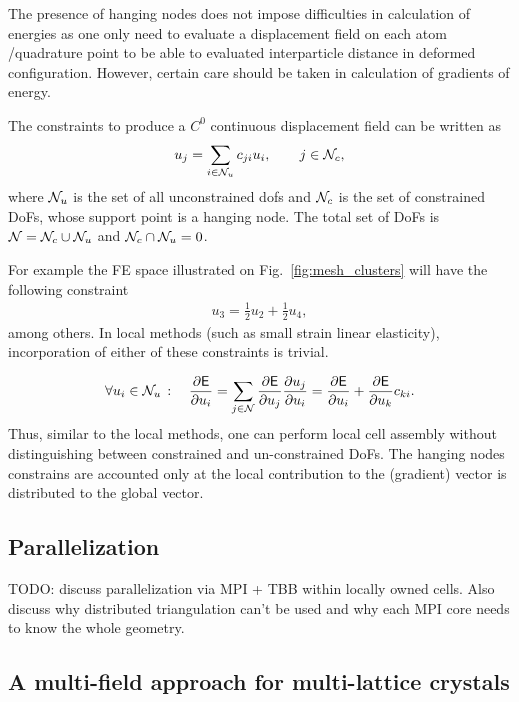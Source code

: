 \documentclass[a4paper,10pt]{article}
\newcommand{\reffig}[1]{Fig.~\ref{fig:#1}}
\def\msf  #1{           \mbox{\!\!      $\sf #1$}}
\def\mcl  #1{               {\cal #1}}
\begin{document}
The presence of hanging nodes does not impose difficulties in calculation of energies as one only need to evaluate a displacement field on each atom /quadrature point to be able to evaluated interparticle distance in deformed configuration. However, certain care should be taken in calculation of gradients of energy. 

The constraints to produce a $C^0$ continuous displacement field can be written as
\begin{align}
u_j = \sum_{i \in \mcl N_{u}} c_{ji} u_i, \qquad   j \in \mcl N_{c} ,
\end{align}
where  $\mcl N_{u}$ is the set of all unconstrained dofs and $\mcl N_c$ is the set of constrained DoFs,
whose support point is a hanging node. The total set of DoFs is $\mcl N = \mcl N_c \cup \mcl N_u$ and $\mcl N_c \cap \mcl N_u = 0$.

For example the FE space illustrated on \reffig{mesh_clusters} will have the following constraint
\begin{align}
u_3 = \frac{1}{2} u_2 + \frac{1}{2} u_4,
\end{align}
among others. 
In local methods (such as small strain linear elasticity), incorporation of either of these constraints is trivial.


\begin{align}
\begin{split}
\forall u_i \in \mcl N_{u} \,: \quad 
\frac{\partial \msf E }{\partial u_i} 
= \sum_{j \in \mcl N} \frac{\partial \msf E }{\partial u_j} \frac{\partial u_j }{\partial u_i}  
= \frac{\partial \msf E }{\partial u_i} + \frac{\partial \msf E }{\partial u_k} c_{ki} .
\end{split}
\end{align}
Thus, similar to the local methods, one can perform local cell assembly without distinguishing between constrained and un-constrained DoFs.
The hanging nodes constrains are accounted only at the local contribution to the (gradient) vector is distributed to the global vector.

\subsection{Parallelization}


{\color{red}TODO}: discuss parallelization via MPI + TBB within locally owned cells. Also discuss why distributed triangulation can't be used and why each MPI core needs to know the whole geometry.

\subsection{A multi-field approach for multi-lattice crystals}
\end{document}
